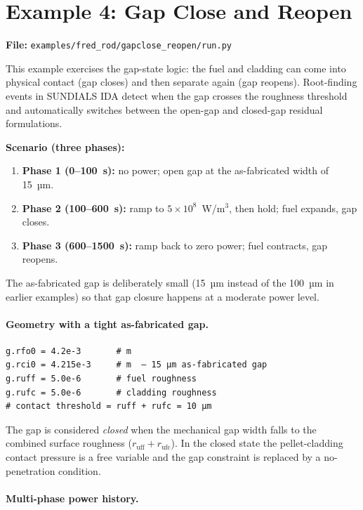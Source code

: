 \documentclass[11pt,a4paper]{article}
\begin{document}
\section{Example 4: Gap Close and Reopen}
\label{sec:gcr}

\textbf{File:} \texttt{examples/fred\_rod/gapclose\_reopen/run.py}

\medskip
This example exercises the gap-state logic: the fuel and cladding can come
into physical contact (gap closes) and then separate again (gap reopens).
Root-finding events in SUNDIALS IDA detect when the gap crosses the
roughness threshold and automatically switches between the open-gap and
closed-gap residual formulations.

\textbf{Scenario (three phases):}
\begin{enumerate}
  \item \textbf{Phase 1 (0--100~s):} no power; open gap at the as-fabricated
        width of 15~µm.
  \item \textbf{Phase 2 (100--600~s):} ramp to $5 \times 10^8$~W/m$^3$,
        then hold; fuel expands, gap closes.
  \item \textbf{Phase 3 (600--1500~s):} ramp back to zero power; fuel
        contracts, gap reopens.
\end{enumerate}

The as-fabricated gap is deliberately small (15~µm instead of the 100~µm
in earlier examples) so that gap closure happens at a moderate power level.

\paragraph{Geometry with a tight as-fabricated gap.}

\begin{lstlisting}
g.rfo0 = 4.2e-3       # m
g.rci0 = 4.215e-3     # m  — 15 µm as-fabricated gap
g.ruff = 5.0e-6       # fuel roughness
g.rufc = 5.0e-6       # cladding roughness
# contact threshold = ruff + rufc = 10 µm
\end{lstlisting}

The gap is considered \emph{closed} when the mechanical gap width falls to
the combined surface roughness ($r_\text{uff} + r_\text{ufc}$).  In the
closed state the pellet-cladding contact pressure is a free variable and
the gap constraint is replaced by a no-penetration condition.

\paragraph{Multi-phase power history.}
\end{document}
